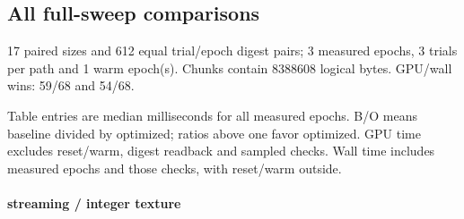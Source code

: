 \subsection{All full-sweep comparisons}

17 paired sizes and 612 equal trial/epoch digest pairs; 3 measured epochs, 3 trials per path and 1 warm epoch(s). Chunks contain 8388608 logical bytes. GPU/wall wins: 59/68 and 54/68.

Table entries are median milliseconds for all measured epochs. B/O means baseline divided by optimized; ratios above one favor optimized. GPU time excludes reset/warm, digest readback and sampled checks. Wall time includes measured epochs and those checks, with reset/warm outside.


\paragraph{streaming / integer texture}

